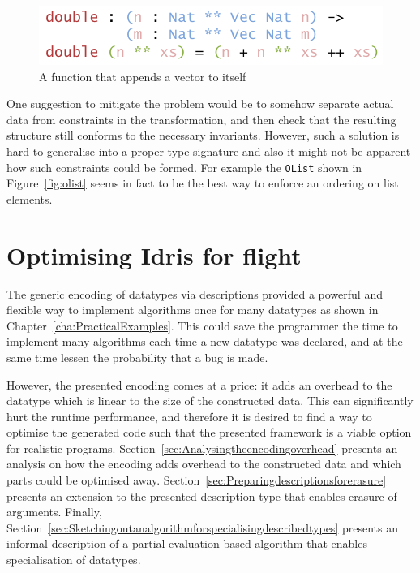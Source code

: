 \documentclass{ituthesis}
\newcommand{\tttype}[1]{\textcolor{type-color}{\texttt{#1}}}
\theoremstyle{break}
\begin{document}
\begin{figure}[ht]
\begin{center}
    \includegraphics[scale=0.5]{Figures/UniplateTransformCounterProofFunc.png}
\end{center}
\caption{A function that appends a vector to itself}
\label{fig:twovecfunc}
\end{figure}

One suggestion to mitigate the problem would be to somehow separate actual data from constraints in the transformation, and then check that the resulting structure still conforms to the necessary invariants.
However, such a solution is hard to generalise into a proper type signature and also it might not be apparent how such constraints could be formed.
For example the \tttype{OList} shown in Figure~\ref{fig:olist} seems in fact to be the best way to enforce an ordering on list elements.


\chapter{Optimising Idris for flight}
\label{cha:OptimizingIdrisforFlight}

The generic encoding of datatypes via descriptions provided a powerful and flexible way to implement algorithms once for many datatypes as shown in Chapter~\ref{cha:PracticalExamples}.
This could save the programmer the time to implement many algorithms each time a new datatype was declared, and at the same time lessen the probability that a bug is made.

However, the presented encoding comes at a price: it adds an overhead to the datatype which is linear to the size of the constructed data.
This can significantly hurt the runtime performance, and therefore it is desired to find a way to optimise the generated code such that the presented framework is a viable option for realistic programs.
Section~\ref{sec:Analysingtheencodingoverhead} presents an analysis on how the encoding adds overhead to the constructed data and which parts could be optimised away.
Section~\ref{sec:Preparingdescriptionsforerasure} presents an extension to the presented description type that enables erasure of arguments.
Finally, Section~\ref{sec:Sketchingoutanalgorithmforspecialisingdescribedtypes} presents an informal description of a partial evaluation-based algorithm that enables
specialisation of datatypes.
\end{document}
